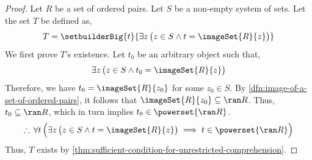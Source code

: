 \begin{proof}
    Let \( R \) be a set of ordered pairs. Let \( S \) be a non-empty system of sets. Let the set \( T \) be defined as,
    \begin{equation}
        \label{eq:T-as-the-set-of-all-images-under-R}
        T = \setbuilderBig{t}{\exists z \, \big( z \in S \land t = \imageSet{R}{z} \big)}
    \end{equation}
    We first prove \( T \)'s existence. Let \( t_{0} \) be an arbitrary object such that,
    \begin{equation*}
        \exists z \, \big( z \in S \land t_{0} = \imageSet{R}{z} \big)
    \end{equation*}
    Therefore, we have \( t_{0} = \imageSet{R}{z_{0}} \) for some \( z_{0} \in S \). By \cref{dfn:image-of-a-set-of-ordered-pairs},
    it follows that \( \imageSet{R}{z_{0}} \subseteq \ran R \). Thus, \( t_{0} \subseteq \ran R \), which in turn implies
    \( t_{0} \in \powerset{\ran R} \).
    \begin{equation*}
        \therefore \, \forall t \, \Big( \exists z \, \big( z \in S \land t = \imageSet{R}{z} \big) \implies t \in \powerset{\ran R} \Big)
    \end{equation*}
    Thus, \( T \) exists by \cref{thm:sufficient-condition-for-unrestricted-comprehension}.


\end{proof}
